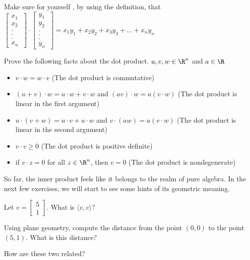 \begin{question}
	Make sure for yourself , by using the definition, that 
	$\begin{bmatrix} x_1 \\x_2\\ .\\.\\. \\ x_n\ \end{bmatrix} \cdot \begin{bmatrix} y_1 \\y_2\\ .\\.\\. \\ y_n\ \end{bmatrix}  = x_1y_1+x_2y_2+x_3y_3 + ...+x_ny_n$
\end{question}

\begin{question}
	Prove the following facts about the dot product.  $u,v,w \in \R^n$ and $a \in \R$
		\begin{itemize}
			\item $v \cdot w = w \cdot v$ (The dot product is commutative)
			
			\item $(u+v)\cdot w = u\cdot w + v\cdot w$ 	and $(av)\cdot w = a(v \cdot w)$ (The dot product is linear in the first argument)
			
			\item $u \cdot (v+w) = u\cdot v+ u\cdot w$ and  $v \cdot (aw) = a(v \cdot  w)$ (The dot product is linear in the second argument)
			
			\item $v\cdot v \geq 0$ (The dot product is positive definite)
			
			\item if $v \cdot z = 0$ for all $z \in \R^n$, then $v =0$ (The dot product is nondegenerate)
		\end{itemize}
\end{question}


So far, the inner product feels like it belongs to the realm of pure algebra.  In the next few exercises, we will start to see some hints of its geometric meaning.

\begin{question}
	Let $v  = \begin{bmatrix}  5  \\ 1\end{bmatrix}$.  What is $\langle v,v\rangle$?  
	
	Using plane geometry, compute the distance from the point $(0,0)$ to the point $(5,1)$.  What is this distance?
	
	How are these two related?
\end{question}

